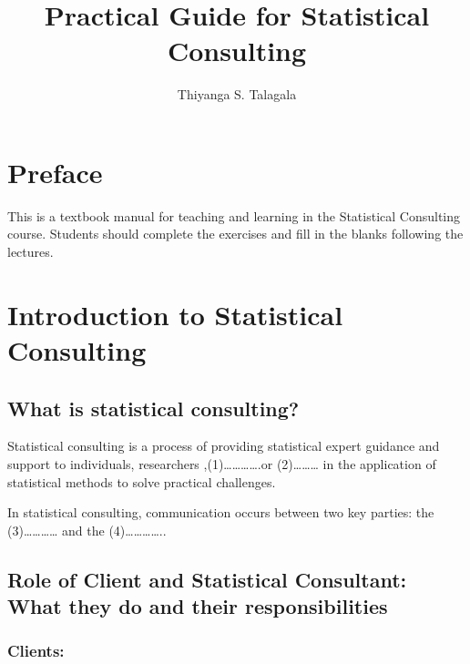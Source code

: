 \documentclass[
  letterpaper,
  DIV=11,
  numbers=noendperiod]{scrreprt}
\title{Practical Guide for Statistical Consulting}
\author{Thiyanga S. Talagala}
\date{}
\renewcommand*\contentsname{Table of contents}
\newcommand\contentsname{Table of contents}
\begin{document}
\maketitle

\renewcommand*\contentsname{Table of contents}
{
\hypersetup{linkcolor=}
\setcounter{tocdepth}{2}
\tableofcontents
}

\chapter*{Preface}\label{preface}


This is a textbook manual for teaching and learning in the Statistical
Consulting course. Students should complete the exercises and fill in
the blanks following the lectures.


\chapter{Introduction to Statistical
Consulting}\label{introduction-to-statistical-consulting}

\section{What is statistical
consulting?}\label{what-is-statistical-consulting}

Statistical consulting is a process of providing statistical expert
guidance and support to individuals, researchers
,(1)\ldots\ldots\ldots\ldots.or (2)\ldots\ldots\ldots{} in the
application of statistical methods to solve practical challenges.

In statistical consulting, communication occurs between two key parties:
the (3)\ldots\ldots\ldots\ldots{} and the (4)\ldots\ldots\ldots\ldots..

\section{Role of Client and Statistical Consultant: What they do and
their
responsibilities}\label{role-of-client-and-statistical-consultant-what-they-do-and-their-responsibilities}

\subsection{Clients:}\label{clients}
\end{document}
